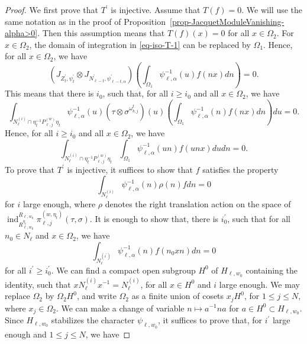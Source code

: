 \documentclass[12pt]{amsart}
\newcommand{\ind}{\operatorname{ind}}
\theoremstyle{remark}
\begin{document}
\begin{proof}
We first prove that $T^\prime$ is injective. Assume that $T(f)=0$. We will use the same notation as in the proof of Proposition~\ref{prop-JacquetModuleVanishing-alpha>0}. Then this assumption means that $T(f)(x)=0$ for all $x\in \Omega_2$. For $x\in \Omega_2$, the domain of integration in \eqref{eq-iso-T-1} can be replaced by $\Omega_1$. Hence, for all $x\in \Omega_2$, we have
\begin{equation*}
	\left( J_{Z_t^\prime,\psi_t^\prime}\otimes J_{N_{\ell-t}^\prime, \psi_{\ell-t,\alpha} ^\prime} \right) \left( \int_{\Omega_1} \psi_{\ell,\alpha}^{-1}(u)f(nx)dn \right)=0.
\end{equation*}
This means that there is $i_0$, such that, for all $i\ge i_0$ and all $x\in \Omega_2$, we have 
\begin{equation*}
\int_{N_{\ell}^{(i)}\cap \eta_t^{-1} P_{\ell,j}^{(w)}\eta_t } \psi_{\ell,\alpha}^{-1}(u) (\tau\otimes \sigma^{\omega_{b,j}^t})(u) 	\left( \int_{\Omega_1} \psi_{\ell,\alpha}^{-1}(n)f(nx)dn \right) du=0.
\end{equation*}
Hence, for all $i\ge i_0$ and all $x\in \Omega_2$, we have
\begin{equation}
\label{eq-lemma-JacquetModule-lemma1-eq1}
	\int_{N_{\ell}^{(i)}\cap \eta_t^{-1} P_{\ell,j}^{(w)}\eta_t } \int_{\Omega_1}  \psi_{\ell,\alpha}^{-1}(un)f(unx)dudn=0.
\end{equation}
To prove that $T^\prime$ is injective, it suffices to show that $f$ satisfies the property
\begin{equation}
\label{eq-lemma-JacquetModule-lemma1-eq2}
\int_{N_{\ell}^{(i)}} \psi_{\ell,\alpha}^{-1}(n)\rho(n)fdn=0	
\end{equation}
for $i$ large enough, 
where $\rho$ denotes the right translation action on the space of $\ind_{R_{\ell,w_0}^{\eta_t}}^{R_{\ell,w_0}} \pi_{\ell,j}^{(w,\eta_t)}(\tau,\sigma)$.
It is enough to show that, there is $i_0^\prime$, such that for all $n_0\in N_{\ell}$ and $x\in \Omega_2$, we have
\begin{equation*}
\int_{N_{\ell}^{(i^\prime)}} \psi_{\ell,\alpha}^{-1}(n)f(n_0 x n)dn=0	
\end{equation*}
for all $i^\prime\ge i_0^\prime$. 
We can find a compact open subgroup $H^0$ of $H_{\ell,w_0}$ containing the identity, such that $x N_{\ell}^{(i)} x^{-1}= N_{\ell}^{(i)}$, for all $x\in H^0$ and $i$ large enough. We may replace $\Omega_2$ by $\Omega_2 H^0$, and write $\Omega_2$ as a finite union of cosets $x_j H^0$, for $1\le j \le N$, where $x_j\in \Omega_2$. We can make a change of variable $n\mapsto a^{-1}n a$ for $a\in H^0\subset H_{\ell,w_0}$. Since $H_{\ell,w_0}$ stabilizes the character $\psi_{\ell,w_0}$, it suffices to prove that, for $i^\prime$ large enough and $1\le j \le N$, we have

\end{proof}
\end{document}
